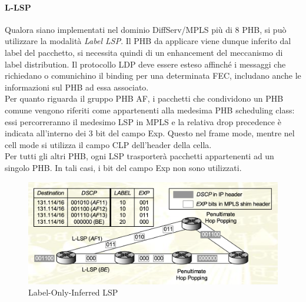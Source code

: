 \documentclass{article}
\begin{document}
\paragraph{L-LSP} Qualora siano implementati nel dominio DiffServ/MPLS più di 8 PHB, si può utilizzare la modalità \textit{Label LSP}. Il PHB da applicare viene dunque inferito dal label del pacchetto, si necessita quindi di un enhancement del meccanismo di label distribution. Il protocollo LDP deve essere esteso affinché i messaggi che richiedano o comunichino il binding per una determinata FEC, includano anche le informazioni sul PHB ad essa associato. \\ Per quanto riguarda il gruppo PHB AF, i pacchetti che condividono un PHB comune vengono riferiti come appartenenti alla medesima PHB scheduling class: essi percorreranno il medesimo LSP in MPLS e la relativa drop precedence è indicata all'interno dei 3 bit del campo Exp. Questo nel frame mode, mentre nel cell mode si utilizza il campo CLP dell'header della cella. \\ Per tutti gli altri PHB, ogni LSP trasporterà pacchetti appartenenti ad un singolo PHB. In tali casi, i bit del campo Exp non sono utilizzati. 
\begin{figure}[H]
    \centering
    \includegraphics[scale=0.4]{figures/labelonly lsp.png}
    \caption{Label-Only-Inferred LSP}
\end{figure}

\newpage
\end{document}

